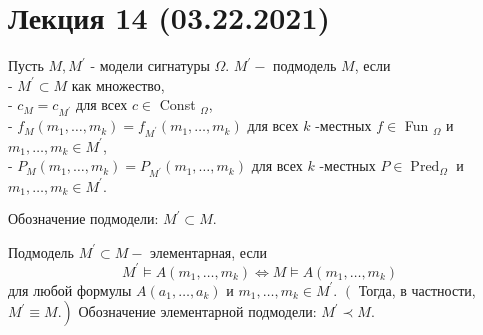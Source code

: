\section{Лекция 14 (03.22.2021)}

\begin{defn}
Пусть $M, M^{\prime}$ - модели сигнатуры $\Omega .$ $M^{\prime}-$ подмодель $M$, если\\
- $M^{\prime} \subset M$ как множество,\\
- $c_{M}=c_{M^{\prime}}$ для всех $c \in$ Const $_{\Omega}$,\\
- $f_{M}\left(m_{1}, \ldots, m_{k}\right)=f_{M^{\prime}}\left(m_{1}, \ldots, m_{k}\right)$
для всех $k$ -местных $f \in$ Fun $_{\Omega}$ и $m_{1}, \ldots, m_{k} \in M^{\prime}$,\\
- $P_{M}\left(m_{1}, \ldots, m_{k}\right)=P_{M^{\prime}}\left(m_{1}, \ldots, m_{k}\right)$
для всех $k$ -местных $P \in \operatorname{Pred}_{\Omega}$ и $m_{1}, \ldots, m_{k} \in M^{\prime} .$
\end{defn}
Обозначение подмодели: $M^{\prime} \subset M .$
\begin{defn}
Подмодель $M^{\prime} \subset M-$ элементарная, если
$$
M^{\prime} \vDash A\left(m_{1}, \ldots, m_{k}\right) \Leftrightarrow M \vDash A\left(m_{1}, \ldots, m_{k}\right)
$$
для любой формулы $A\left(a_{1}, \ldots, a_{k}\right)$ и $m_{1}, \ldots, m_{k} \in M^{\prime} .$
$\left(\right.$ Тогда, в частности, $\left.M^{\prime} \equiv M .\right)$ Обозначение элементарной подмодели: $M^{\prime} \prec M .$
\end{defn}

